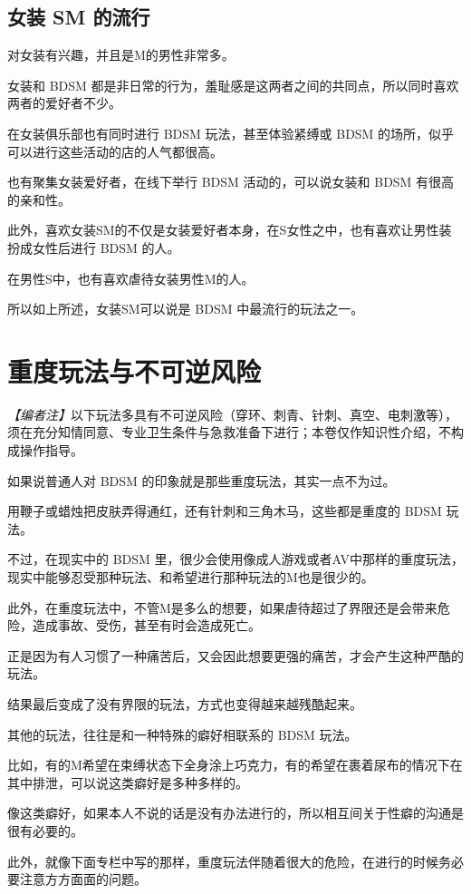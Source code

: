\documentclass[12pt,UTF8]{ctexbook}
\begin{document}
\subsection{女装 SM 的流行}

对女装有兴趣，并且是M的男性非常多。

女装和 BDSM 都是非日常的行为，羞耻感是这两者之间的共同点，所以同时喜欢两者的爱好者不少。

在女装俱乐部也有同时进行 BDSM 玩法，甚至体验紧缚或 BDSM 的场所，似乎可以进行这些活动的店的人气都很高。

也有聚集女装爱好者，在线下举行 BDSM 活动的，可以说女装和 BDSM 有很高的亲和性。

此外，喜欢女装SM的不仅是女装爱好者本身，在S女性之中，也有喜欢让男性装扮成女性后进行 BDSM 的人。

在男性S中，也有喜欢虐待女装男性M的人。

所以如上所述，女装SM可以说是 BDSM 中最流行的玩法之一。

\section{重度玩法与不可逆风险}

\noindent\textit{【编者注】}以下玩法多具有不可逆风险（穿环、刺青、针刺、真空、电刺激等），须在充分知情同意、专业卫生条件与急救准备下进行；本卷仅作知识性介绍，不构成操作指导。

如果说普通人对 BDSM 的印象就是那些重度玩法，其实一点不为过。

用鞭子或蜡烛把皮肤弄得通红，还有针刺和三角木马，这些都是重度的 BDSM 玩法。

不过，在现实中的 BDSM 里，很少会使用像成人游戏或者AV中那样的重度玩法，现实中能够忍受那种玩法、和希望进行那种玩法的M也是很少的。

此外，在重度玩法中，不管M是多么的想要，如果虐待超过了界限还是会带来危险，造成事故、受伤，甚至有时会造成死亡。

正是因为有人习惯了一种痛苦后，又会因此想要更强的痛苦，才会产生这种严酷的玩法。

结果最后变成了没有界限的玩法，方式也变得越来越残酷起来。

其他的玩法，往往是和一种特殊的癖好相联系的 BDSM 玩法。

比如，有的M希望在束缚状态下全身涂上巧克力，有的希望在裹着尿布的情况下在其中排泄，可以说这类癖好是多种多样的。

像这类癖好，如果本人不说的话是没有办法进行的，所以相互间关于性癖的沟通是很有必要的。

此外，就像下面专栏中写的那样，重度玩法伴随着很大的危险，在进行的时候务必要注意方方面面的问题。
\end{document}
